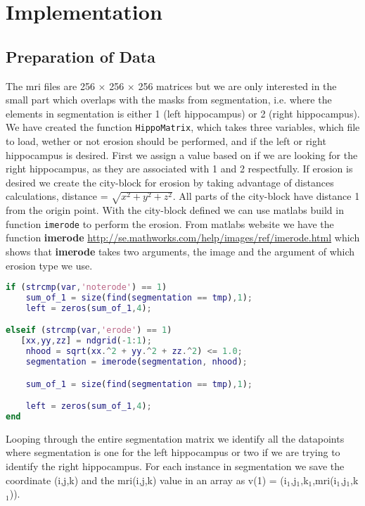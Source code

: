 \chapter{Implementation}

\section{Preparation of Data}
The mri files are 256 $\times$ 256 $\times$ 256 matrices but we are only interested in the small part which overlaps with the masks from segmentation, i.e. where the elements in segmentation is either 1 (left hippocampus) or 2 (right hippocampus).
We have created the function \texttt{HippoMatrix}, which takes three variables, which file to load, wether or not erosion should be performed, and if the left or right hippocampus is desired.
First we assign a value based on if we are looking for the right hippocampus, as they are associated with 1 and 2 respectfully.
If erosion is desired we create the city-block for erosion by taking advantage of distances calculations, distance = $\sqrt{x^2+y^2+z^2}$. All parts of the city-block have distance 1 from the origin point. With the city-block defined we can use matlabs build in function \texttt{imerode} to perform the erosion. From matlabs website we have the function \textbf{imerode} \href{http://se.mathworks.com/help/images/ref/imerode.html}{http://se.mathworks.com/help/images/ref/imerode.html} which shows that \textbf{imerode} takes two arguments, the image and the argument of which erosion type we use.

\begin{lstlisting}[language=Matlab]
if (strcmp(var,'noterode') == 1)
    sum_of_1 = size(find(segmentation == tmp),1);
    left = zeros(sum_of_1,4);

elseif (strcmp(var,'erode') == 1)
   [xx,yy,zz] = ndgrid(-1:1);
    nhood = sqrt(xx.^2 + yy.^2 + zz.^2) <= 1.0;
    segmentation = imerode(segmentation, nhood);

    sum_of_1 = size(find(segmentation == tmp),1);

    left = zeros(sum_of_1,4);
end
\end{lstlisting}

Looping through the entire segmentation matrix we identify all the datapoints where segmentation is one for the left hippocampus or two if we are trying to identify the right hippocampus. For each instance in segmentation we save the coordinate (i,j,k) and the mri(i,j,k) value in an array as v(1) = (i$_1$,j$_1$,k$_1$,mri(i$_1$,j$_1$,k$_1$)).

